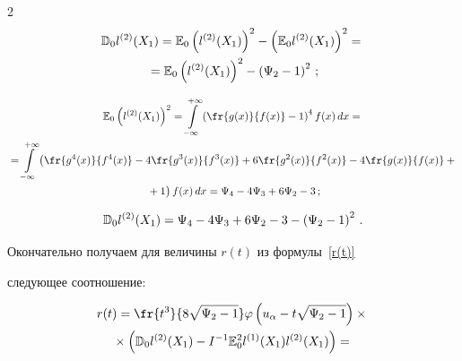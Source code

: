 \begin{multicols}{2}
\begin{multline*}

\Dd_0

l^{(2)}(X_1)=\E_0\left(l^{(2)}(X_1)\right)^2-\left(\E_0l^{(2)}(X_1)\right)^2={}\\

{}=\E_0\left(l^{(2)}(X_1)\right)^2-\left(\Psi_2-1\right)^2\,;

\end{multline*}



\vspace*{-6pt}



\noindent

\begin{multline*}

\E_0\left(l^{(2)}(X_1)\right)^2=\int\limits_{-\infty}^{+\infty}\left(

\fr{g(x)}{f(x)}-1\right)^4f(x)\,dx={}\\

{}=\int\limits_{-\infty}^{+\infty}\left(\fr{g^4(x)}{f^4(x)}-4\fr{g^3(x)}{f^3(x)}

+6\fr{g^2(x)}{f^2(x)}-4\fr{g(x)}{f(x)}+{}\right.\\

\left.{}+1

\vphantom{\fr{g^2(x)}{f^2(x)}}\right)f(x)\,dx

=\Psi_4-4\Psi_3+6\Psi_2-3\,;

\end{multline*}



\vspace*{-6pt}

\noindent

$$

\Dd_0 l^{(2)}(X_1)=\Psi_4-4\Psi_3+6\Psi_2-3-\left(\Psi_2-1\right)^2\,.

$$

Окончательно получаем для величины $r(t)$ из формулы~\eqref{r(t)}

следующее соотношение:

\begin{multline}

r(t)=\fr{t^3}{8\sqrt{\Psi_2-1}}\varphi\left(u_\alpha-t\sqrt{\Psi_2-1}\right)\times{}\\

{}\times\left(\Dd_0

l^{(2)}(X_1)-I^{-1}\E_0^2 l^{(1)}(X_1)l^{(2)}(X_1)\right)={}\\


\end{multline}
\end{multicols}
